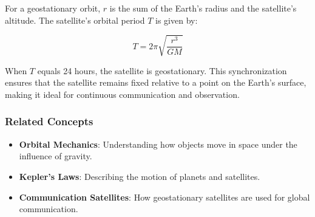 For a geostationary orbit, \( r \) is the sum of the Earth's radius and the satellite's altitude. The satellite's orbital period \( T \) is given by:

\[
T = 2\pi \sqrt{\frac{r^3}{G M}}
\]

When \( T \) equals 24 hours, the satellite is geostationary. This synchronization ensures that the satellite remains fixed relative to a point on the Earth's surface, making it ideal for continuous communication and observation.

\subsubsection*{Related Concepts}
\begin{itemize}
    \item \textbf{Orbital Mechanics}: Understanding how objects move in space under the influence of gravity.
    \item \textbf{Kepler's Laws}: Describing the motion of planets and satellites.
    \item \textbf{Communication Satellites}: How geostationary satellites are used for global communication.
\end{itemize}

